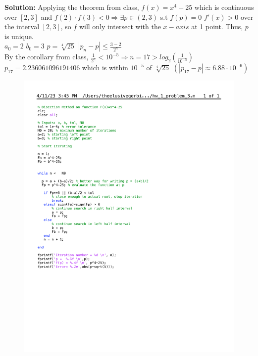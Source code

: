 \documentclass[12pt]{article}
\begin{document}
\begin{enumerate}[label=\bfseries Problem \arabic*:]
    \textbf{Solution:} \newline
    Applying the theorem from class, $f(x)=x^4-25$ which is continuous over $[2,3]$ and $f(2)\cdot f(3)<0 \Rightarrow \exists p \in (2,3)$ s.t $f(p)=0$\newline
    $f'(x)>0$ over the interval $[2,3]$, so $f$ will only intersect with the $x-axis$ at 1 point. Thus, $p$ is unique.\\
    $a_0=2$ $b_0=3$ $p=\sqrt[4]{25}$ \newline
    $|p_n-p|\le \frac{3-2}{2^n}$\\
    By the corollary from class, $\frac{1}{2^n}<10^{-5} \Rightarrow n=17>log_2(\frac{1}{10^{-5}})$\newline
    $p_{17}=2.236061096191406$ which is within $10^{-5}$ of $\sqrt[4]{25}$ $(|p_{17}-p|\approx 6.88\cdot 10^{-6})$\newline
    \begin{figure}[h!]
        \centering
        \begin{minipage}{.5\textwidth}
            \centering
            \includegraphics[width=\linewidth]{hw_1_problem_3.pdf}  

\end{minipage}
\end{figure}
\end{enumerate}
\end{document}
